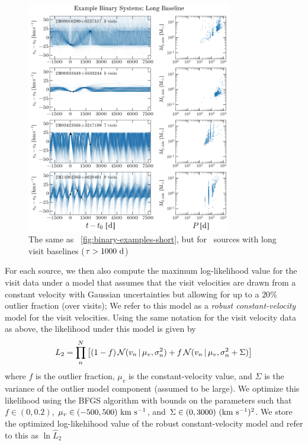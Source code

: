 \documentclass[modern]{aastex63}
\begin{document}
\begin{figure}[!t]
    \begin{center}
    \includegraphics[width=0.8\textwidth]{example-binaries-long-placeholder.png}
    \end{center}
    \caption{%
    The same as \figurename~\ref{fig:binary-examples-short}, but for \apogee\
    sources with long visit baselines ($\tau > 1000~\mathrm{d}$)
    \label{fig:binary-examples-long}
    }
\end{figure}

For each source, we then also compute the maximum log-likelihood value for the
visit data under a model that assumes that the visit velocities are drawn from a
constant velocity with Gaussian uncertainties but allowing for up to a $20\%$
outlier fraction (over visits); We refer to this model as a \emph{robust
constant-velocity} model for the visit velocities.
Using the same notation for the visit velocity data as above, the likelihood
under this model is given by
\begin{equation}
    L_2 = \prod_n^N \left[(1-f) \, \mathcal{N}(v_n \given \mu_v, \sigma_n^2)
        + f\, \mathcal{N}(v_n \given \mu_v, \sigma_n^2 + \Sigma) \right]
\end{equation}
where $f$ is the outlier fraction, $\mu_v$ is the constant-velocity value, and
$\Sigma$ is the variance of the outlier model component (assumed to be large).
We optimize this likelihood using the BFGS algorithm \citep{Nocedal:2006} with
bounds on the parameters such that $f \in (0, 0.2)$, $\mu_v \in (-500,
500)~\mathrm{km}~\mathrm{s}^{-1}$, and $\Sigma \in (0, 3000)~(\mathrm{km}~\mathrm{s}^{-1})^2$.
We store the optimized log-likehihood value of the robust constant-velocity
model and refer to this as $\ln \hat{L}_2$
\end{document}

